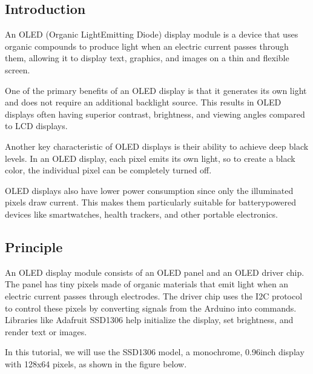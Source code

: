 \documentclass[a4paper,11pt,english]{sphinxmanual}
\begin{document}
\subsection{Introduction}
\label{\detokenize{Components_Kit/component_oled:introduction}}
\sphinxAtStartPar
An OLED (Organic Light\sphinxhyphen{}Emitting Diode) display module is a device that uses organic compounds to produce light when an electric current passes through them, allowing it to display text, graphics, and images on a thin and flexible screen.

\sphinxAtStartPar
One of the primary benefits of an OLED display is that it generates its own light and does not require an additional backlight source. This results in OLED displays often having superior contrast, brightness, and viewing angles compared to LCD displays.

\sphinxAtStartPar
Another key characteristic of OLED displays is their ability to achieve deep black levels. In an OLED display, each pixel emits its own light, so to create a black color, the individual pixel can be completely turned off.

\sphinxAtStartPar
OLED displays also have lower power consumption since only the illuminated pixels draw current. This makes them particularly suitable for battery\sphinxhyphen{}powered devices like smartwatches, health trackers, and other portable electronics.


\subsection{Principle}
\label{\detokenize{Components_Kit/component_oled:principle}}
\sphinxAtStartPar
An OLED display module consists of an OLED panel and an OLED driver chip. The panel has tiny pixels made of organic materials that emit light when an electric current passes through electrodes. The driver chip uses the I2C protocol to control these pixels by converting signals from the Arduino into commands. Libraries like Adafruit SSD1306 help initialize the display, set brightness, and render text or images.

\sphinxAtStartPar
In this tutorial, we will use the SSD1306 model, a monochrome, 0.96\sphinxhyphen{}inch display with 128x64 pixels, as shown in the figure below.
\end{document}
